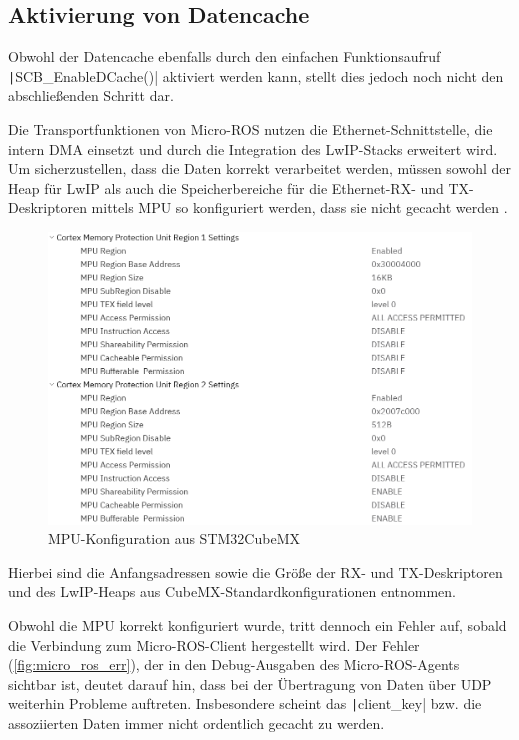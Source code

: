 \subsection{Aktivierung von Datencache}

Obwohl der Datencache ebenfalls durch den einfachen Funktionsaufruf
\texttt|SCB_EnableDCache()| aktiviert werden kann, stellt dies jedoch
noch nicht den abschließenden Schritt dar.

Die Transportfunktionen von Micro-ROS nutzen die Ethernet-Schnittstelle, die
intern DMA einsetzt und durch die Integration des LwIP-Stacks erweitert wird. Um
sicherzustellen, dass die Daten korrekt verarbeitet werden, müssen sowohl der
Heap für LwIP als auch die Speicherbereiche für die Ethernet-RX- und
TX-Deskriptoren mittels \ac{MPU} so konfiguriert werden, dass sie nicht gecacht
werden \cite{STM32H7_LwIP_Examples}.

\begin{figure}[H]
    \centering
    \includegraphics[width=1\textwidth]{assets/mpu_conf_cubemx}
    \caption{MPU-Konfiguration aus STM32CubeMX}
\end{figure}

Hierbei sind die Anfangsadressen sowie die Größe der RX- und TX-Deskriptoren
und des LwIP-Heaps aus CubeMX-Standardkonfigurationen entnommen.

Obwohl die MPU korrekt konfiguriert wurde, tritt dennoch ein Fehler auf, sobald
die Verbindung zum Micro-ROS-Client hergestellt wird. Der Fehler
(\ref{fig:micro_ros_err}), der in den Debug-Ausgaben des Micro-ROS-Agents
sichtbar ist, deutet darauf hin, dass bei der Übertragung von Daten über UDP
weiterhin Probleme auftreten. Insbesondere scheint das
\texttt|client_key| bzw. die assoziierten Daten immer nicht ordentlich
gecacht zu werden.

